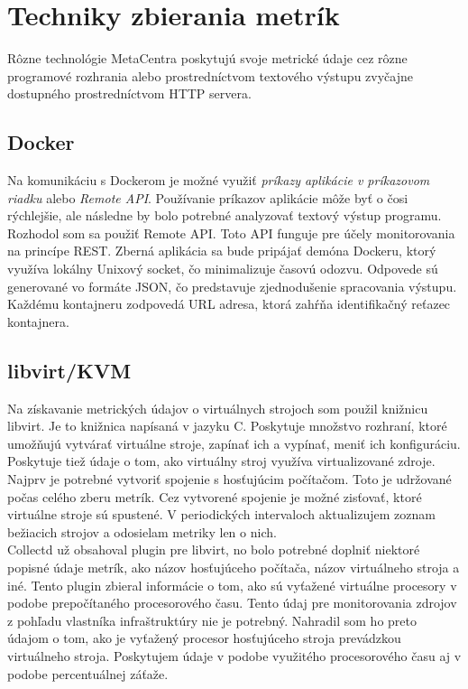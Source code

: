 \documentclass[printed,11pt,twoside,color,cover,table]{fithesis3}
\begin{document}
\section{Techniky zbierania metrík}
Rôzne technológie MetaCentra poskytujú svoje metrické údaje cez rôzne programové rozhrania alebo prostredníctvom textového výstupu zvyčajne
dostupného prostredníctvom HTTP servera.

\subsection{Docker}
Na komunikáciu s Dockerom je možné využiť \textit{príkazy aplikácie v príkazovom riadku} alebo \textit{Remote API}.
Používanie príkazov aplikácie môže byť o čosi rýchlejšie, ale následne by bolo potrebné analyzovať textový výstup programu.
Rozhodol som sa použiť Remote API. Toto API funguje pre účely monitorovania na princípe REST. Zberná aplikácia sa bude pripájať demóna Dockeru, ktorý využíva lokálny Unixový socket, čo minimalizuje časovú odozvu.
Odpovede sú generované vo formáte JSON, čo predstavuje zjednodušenie spracovania výstupu. Každému kontajneru zodpovedá URL adresa, ktorá zahŕňa identifikačný reťazec kontajnera.

\subsection{libvirt/KVM}
Na získavanie metrických údajov o virtuálnych strojoch som použil knižnicu libvirt. Je to knižnica napísaná v jazyku C. Poskytuje množstvo
rozhraní, ktoré umožňujú vytvárať virtuálne stroje, zapínať ich a vypínať, meniť ich konfiguráciu. Poskytuje tiež údaje o tom, ako virtuálny
stroj využíva virtualizované zdroje. 
\\Najprv je potrebné vytvoriť spojenie s hosťujúcim počítačom. Toto je udržované počas celého zberu metrík. Cez vytvorené spojenie
je možné zisťovať, ktoré virtuálne stroje sú spustené. V periodických intervaloch aktualizujem zoznam bežiacich strojov a odosielam
metriky len o nich.
\\Collectd už obsahoval plugin pre libvirt, no bolo potrebné doplniť niektoré popisné údaje metrík, ako názov hosťujúceho počítača,
názov virtuálneho stroja a iné. Tento plugin zbieral informácie o tom, ako sú vyťažené virtuálne procesory v podobe prepočítaného procesorového času.
Tento údaj pre monitorovania zdrojov z pohľadu vlastníka infraštruktúry nie je potrebný. Nahradil som ho preto údajom o tom, ako je vyťažený
procesor hosťujúceho stroja prevádzkou virtuálneho stroja. Poskytujem údaje v podobe využitého procesorového času aj v podobe percentuálnej záťaže.
\end{document}
